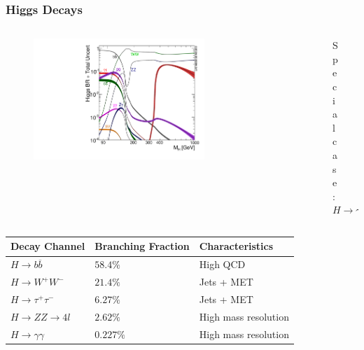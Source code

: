 \documentclass[xcolor={usenames,dvipsnames,svgnames,table}]{beamer}
\begin{document}
\begin{frame}
    \frametitle{Higgs Decays}
    \begin{columns}
    \begin{column}{0.49\textwidth}
        \begin{figure}[t]
            \includegraphics[width=0.75\textwidth]{plots/Higgs_BR.pdf}
        \end{figure}
    \end{column}
    \begin{column}{0.49\textwidth}
		\begin{figure}[t]
        \centering \textcolor{color1}{Special case: $H \rightarrow \gamma\gamma$}\\
        \vspace{0.5cm}
        \centering 
        \end{figure}
    \end{column}
    \end{columns}
    \begin{minipage}{1.\textwidth}
		\begin{center}
		\begin{table}[c]
        \centering
        \hspace*{-0.5cm}
        \begin{tabular}{l|l|l}
        Decay Channel                     & Branching Fraction & Characteristics      \\ \hline \hline
        $H \rightarrow b\overline{b}$     & $58.4\%$           & High QCD             \\ \hline
        $H \rightarrow W^+W^-$            & $21.4\%$           & Jets + MET           \\ \hline
        $H \rightarrow \tau^+ \tau^-$     & $6.27\%$           & Jets + MET		      \\ \hline
        $H \rightarrow ZZ \rightarrow 4l$ & $2.62\%$           & High mass resolution \\ \hline
        $H \rightarrow \gamma \gamma$     & $0.227\%$          & High mass resolution \\
        \end{tabular}
        \end{table}
		\end{center}
    \end{minipage}
\end{frame}
\end{document}
